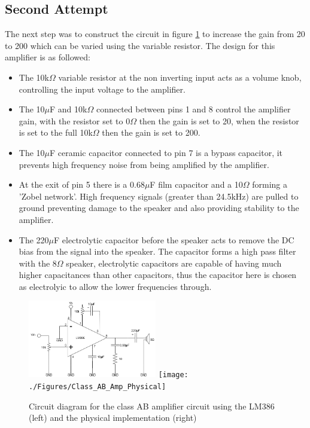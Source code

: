 \documentclass[12pt, a4paper]{article}
\begin{document}
\subsection{Second Attempt}
The next step was to construct the circuit in figure \ref{fig:lm386Circuit} to increase the gain from 20 to 200 which can be varied using the variable resistor. The design for this amplifier is as followed:
\begin{itemize}
\item The 10k$\Omega$ variable resistor at the non inverting input acts as a volume knob, controlling the input voltage to the amplifier.
\item The 10$\mu$F and 10k$\Omega$ connected between pins 1 and 8 control the amplifier gain, with the resistor set to 0$\Omega$ then the gain is set to 20, when the resistor is set to the full 10k$\Omega$ then the gain is set to 200.
\item The 10$\mu$F ceramic capacitor connected to pin 7 is a bypass capacitor, it prevents high frequency noise from being amplified by the amplifier. 
\item At the exit of pin 5 there is a 0.68$\mu$F film capacitor and a 10$\Omega$ forming a 'Zobel network'. High frequency signals (greater than 24.5kHz) are pulled to ground preventing damage to the speaker and also providing stability to the amplifier.
\item The 220$\mu$F electrolytic capacitor before the speaker acts to remove the DC bias from the signal into the speaker. The capacitor forms a high pass filter with the 8$\Omega$ speaker, electrolytic capacitors are capable of having much higher capacitances than other capacitors, thus the capacitor here is chosen as electrolyic to allow the lower frequencies through. 
\end{itemize}
\begin{figure}[!htb]
	\includegraphics[width=0.5\textwidth]{./Figures/Class_AB_Amp}
	\texttt{[image: ./Figures/Class\_AB\_Amp\_Physical]}	
	\caption{Circuit diagram for the class AB amplifier circuit using the LM386 (left) and the physical implementation (right)}
	\label{fig:lm386Circuit}
\end{figure}
\pagebreak
\end{document}
